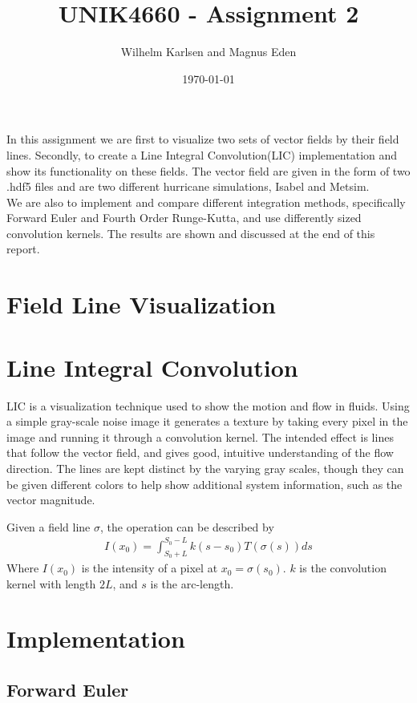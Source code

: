 \documentclass[11pt,a4paper,english]{article}
\title{UNIK4660 - Assignment 2}
\author{Wilhelm Karlsen and Magnus Eden}
\date{\today}
\numberwithin{equation}{section}
\begin{document}
\maketitle
In this assignment we are first to visualize two sets of vector fields by their field lines. Secondly, to create a Line Integral Convolution(LIC) implementation and show its functionality on these fields. The vector field are given in the form of two .hdf5 files and are two different hurricane simulations, Isabel and Metsim. 
\\
We are also to implement and compare different integration methods, specifically Forward Euler and Fourth Order Runge-Kutta, and use differently sized convolution kernels. The results are shown and discussed at the end of this report.

\section{Field Line Visualization}

\section{Line Integral Convolution}
LIC is a visualization technique used to show the motion and flow in fluids. Using a simple gray-scale noise image it generates a texture by taking every pixel in the image and running it through a convolution kernel. The intended effect is lines that follow the vector field, and gives good, intuitive understanding of the flow direction. The lines are kept distinct by the varying gray scales, though they can be given different colors to help show additional system information, such as the vector magnitude.

Given a field line $\sigma$, the operation can be described by
\begin{align*}
	I(x_0) = \int_{S_0+L}^{S_0-L}k(s - s_0)T(\sigma(s))ds
\end{align*}
Where $I(x_0)$ is the intensity of a pixel at $x_0 = \sigma(s_0)$. $k$ is the convolution kernel with length $2L$, and $s$ is the arc-length.

\section{Implementation}

\subsection{Forward Euler}
\end{document}
